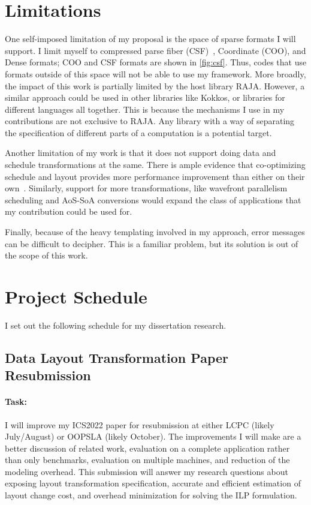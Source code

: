 \documentclass{article}
\begin{document}
\section{Limitations}
\label{Sec:Limitations}
One self-imposed limitation of my proposal is the space of sparse formats I will support.
I limit myself to compressed parse fiber (CSF)~\cite{smith2015tensor}, Coordinate (COO), and Dense formats; 
COO and CSF formats are shown in \autoref{fig:csf}.
Thus, codes that use formats outside of this space will not be able to use my framework.
More broadly, the impact of this work is partially limited by the host library RAJA. 
However, a similar approach could be used in other libraries like Kokkos, or libraries for different languages all together.
This is because the mechanisms I use in my contributions are not exclusive to RAJA. 
Any library with a way of separating the specification of different parts of a computation is a potential target.

Another limitation of my work is that it does not support doing data and schedule transformations at the same. 
There is ample evidence that co-optimizing schedule and layout provides more performance improvement than either on their own~\cite{shirako2019integrating}.
Similarly, support for more transformations, like wavefront parallelism scheduling and AoS-SoA conversions would expand the class of applications that my contribution could be used for.

Finally, because of the heavy templating involved in my approach, error messages can be difficult to decipher. 
This is a familiar problem, but its solution is out of the scope of this work.


\section{Project Schedule}
\label{Sec:Schedule}
I set out the following schedule for my dissertation research.

\subsection{Data Layout Transformation Paper Resubmission}

\paragraph{Task:} I will improve my ICS2022 paper for resubmission at either LCPC (likely July/August) or OOPSLA (likely October). 
The improvements I will make are a better discussion of related work, evaluation on a complete application rather than only benchmarks, evaluation on multiple machines, and reduction of the modeling overhead.
This submission will answer my research questions about exposing layout transformation specification, accurate and efficient estimation of layout change cost, and overhead minimization for solving the ILP formulation.
\end{document}

